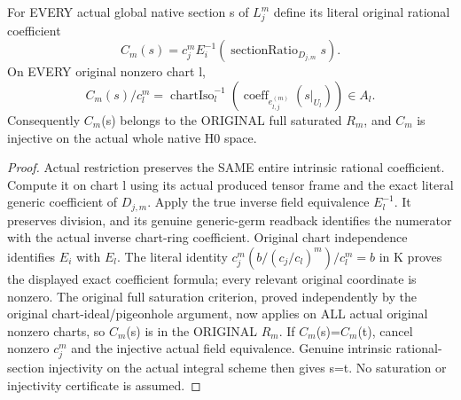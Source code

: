 \begin{theorem}
\label{thm:seven-native-original-tensor-global-coefficients}
\leanok
For EVERY actual global native section s of $L_j^m$ define its literal
original rational coefficient
\[
 C_m(s)=c_j^m E_i^{-1}(\operatorname{sectionRatio}_{D_{j,m}}s).
\]
On EVERY original nonzero chart l,
\[
 C_m(s)/c_l^m=\operatorname{chartIso}_l^{-1}
   (\operatorname{coeff}_{e_{l,j}^{(m)}}(s|_{U_l}))\in A_l.
\]
Consequently $C_m$(s) belongs to the ORIGINAL full saturated $R_m$, and $C_m$
is injective on the actual whole native H0 space.
\end{theorem}
\begin{proof}
Actual restriction preserves the SAME entire intrinsic rational coefficient.
Compute it on chart l using its actual produced tensor frame and the exact
literal generic coefficient of $D_{j,m}$. Apply the true inverse field
equivalence $E_l^{-1}$. It preserves division, and its genuine generic-germ
readback identifies the numerator with the actual inverse chart-ring
coefficient. Original chart independence identifies $E_i$ with $E_l$. The
literal identity
$c_j^m(b/(c_j/c_l)^m)/c_l^m=b$ in K proves the displayed exact coefficient
formula; every relevant original coordinate is nonzero.
The original full saturation criterion, proved independently by the
original chart-ideal/pigeonhole argument, now applies on ALL actual original
nonzero charts, so $C_m$(s) is in the ORIGINAL $R_m$. If $C_m$(s)=$C_m$(t), cancel
nonzero $c_j^m$ and the injective actual field equivalence. Genuine intrinsic
rational-section injectivity on the actual integral scheme then gives s=t.
No saturation or injectivity certificate is assumed.
\end{proof}

